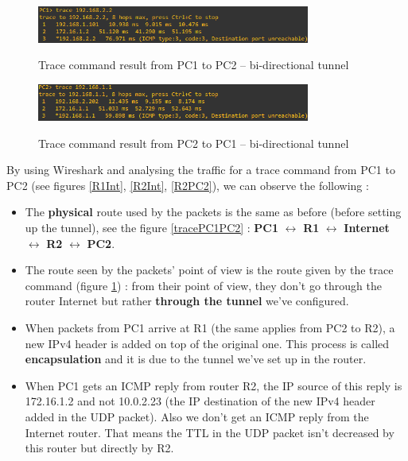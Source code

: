 \documentclass[10pt,a4paper]{ULBreport}
\begin{document}
\begin{figure}[H]
    \caption{Trace command result from PC1 to PC2 -- bi-directional tunnel}
    \centering
    \includegraphics[width=0.8\textwidth]{Images/tracePC1PC2tun.png}
    \label{tracePC1PC2tun}
\end{figure}   

\begin{figure}[H]
    \caption{Trace command result from PC2 to PC1 -- bi-directional tunnel}
    \centering
    \includegraphics[width=0.8\textwidth]{Images/tracePC2PC1tun.png}
    \label{tracePC2PC1tun}
\end{figure}   

By using Wireshark and analysing the traffic for a trace command from PC1 to PC2 (see figures \ref{R1Int}, \ref{R2Int}, \ref{R2PC2}), we can observe the following : 

\begin{itemize}
    \item The \textbf{physical} route used by the packets is the same as before (before setting up the tunnel), see the figure \ref{tracePC1PC2} : \textbf{PC1} $\leftrightarrow$ \textbf{R1} $\leftrightarrow$ \textbf{Internet}  $\leftrightarrow$ \textbf{R2}  $\leftrightarrow$ \textbf{PC2}.
    \item The route seen by the packets' point of view is the route given by the trace command (figure \ref{tracePC1PC2tun}) : from their point of view, they don't go through the router Internet but rather \textbf{through the tunnel} we've configured.
    \item When packets from PC1 arrive at R1 (the same applies from PC2 to R2), a new IPv4 header is added on top of the original one. This process is called \textbf{encapsulation} and it is due to the tunnel we've set up in the router.
    \item When PC1 gets an ICMP reply from router R2, the IP source of this reply is 172.16.1.2 and not 10.0.2.23 (the IP destination of the new IPv4 header added in the UDP packet). Also we don't get an ICMP reply from the Internet router. That means the TTL in the UDP packet isn't decreased by this router but directly by R2.
\end{itemize}
\end{document}
